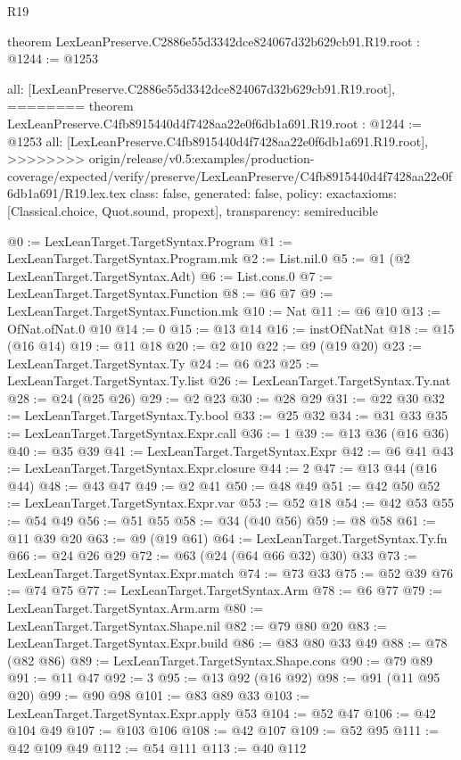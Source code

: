 \begin{lexlean}{R19}
\begin{coremodule}
{{{{{{{{{{{{{theorem LexLeanPreserve.C2886e55d3342dce824067d32b629cb91.R19.root : @1244 := @1253 {
  all: [LexLeanPreserve.C2886e55d3342dce824067d32b629cb91.R19.root],
========
theorem LexLeanPreserve.C4fb8915440d4f7428aa22e0f6db1a691.R19.root : @1244 := @1253 {
  all: [LexLeanPreserve.C4fb8915440d4f7428aa22e0f6db1a691.R19.root],
>>>>>>>> origin/release/v0.5:examples/production-coverage/expected/verify/preserve/LexLeanPreserve/C4fb8915440d4f7428aa22e0f6db1a691/R19.lex.tex
  class: false,
  generated: false,
  policy: exact{axioms: [Classical.choice, Quot.sound, propext]},
  transparency: semireducible
}

@0 := LexLeanTarget.TargetSyntax.Program
@1 := LexLeanTarget.TargetSyntax.Program.mk
@2 := List.nil.{0}
@5 := @1 (@2 LexLeanTarget.TargetSyntax.Adt)
@6 := List.cons.{0}
@7 := LexLeanTarget.TargetSyntax.Function
@8 := @6 @7
@9 := LexLeanTarget.TargetSyntax.Function.mk
@10 := Nat
@11 := @6 @10
@13 := OfNat.ofNat.{0} @10
@14 := 0
@15 := @13 @14
@16 := instOfNatNat
@18 := @15 (@16 @14)
@19 := @11 @18
@20 := @2 @10
@22 := @9 (@19 @20)
@23 := LexLeanTarget.TargetSyntax.Ty
@24 := @6 @23
@25 := LexLeanTarget.TargetSyntax.Ty.list
@26 := LexLeanTarget.TargetSyntax.Ty.nat
@28 := @24 (@25 @26)
@29 := @2 @23
@30 := @28 @29
@31 := @22 @30
@32 := LexLeanTarget.TargetSyntax.Ty.bool
@33 := @25 @32
@34 := @31 @33
@35 := LexLeanTarget.TargetSyntax.Expr.call
@36 := 1
@39 := @13 @36 (@16 @36)
@40 := @35 @39
@41 := LexLeanTarget.TargetSyntax.Expr
@42 := @6 @41
@43 := LexLeanTarget.TargetSyntax.Expr.closure
@44 := 2
@47 := @13 @44 (@16 @44)
@48 := @43 @47
@49 := @2 @41
@50 := @48 @49
@51 := @42 @50
@52 := LexLeanTarget.TargetSyntax.Expr.var
@53 := @52 @18
@54 := @42 @53
@55 := @54 @49
@56 := @51 @55
@58 := @34 (@40 @56)
@59 := @8 @58
@61 := @11 @39 @20
@63 := @9 (@19 @61)
@64 := LexLeanTarget.TargetSyntax.Ty.fn
@66 := @24 @26 @29
@72 := @63 (@24 (@64 @66 @32) @30) @33
@73 := LexLeanTarget.TargetSyntax.Expr.match
@74 := @73 @33
@75 := @52 @39
@76 := @74 @75
@77 := LexLeanTarget.TargetSyntax.Arm
@78 := @6 @77
@79 := LexLeanTarget.TargetSyntax.Arm.arm
@80 := LexLeanTarget.TargetSyntax.Shape.nil
@82 := @79 @80 @20
@83 := LexLeanTarget.TargetSyntax.Expr.build
@86 := @83 @80 @33 @49
@88 := @78 (@82 @86)
@89 := LexLeanTarget.TargetSyntax.Shape.cons
@90 := @79 @89
@91 := @11 @47
@92 := 3
@95 := @13 @92 (@16 @92)
@98 := @91 (@11 @95 @20)
@99 := @90 @98
@101 := @83 @89 @33
@103 := LexLeanTarget.TargetSyntax.Expr.apply @53
@104 := @52 @47
@106 := @42 @104 @49
@107 := @103 @106
@108 := @42 @107
@109 := @52 @95
@111 := @42 @109 @49
@112 := @54 @111
@113 := @40 @112
}}}}}}}}}}}}}}
\end{coremodule}
\end{lexlean}
